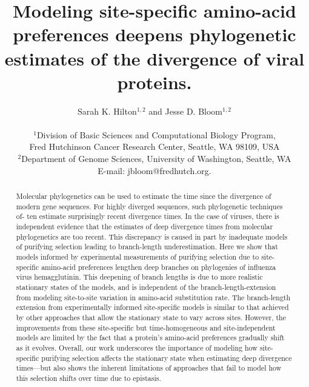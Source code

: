 \documentclass[11pt]{article}
\title{Modeling site-specific amino-acid preferences deepens phylogenetic estimates of the divergence of viral proteins.}
\author
{Sarah K. Hilton$^{1,2}$  and Jesse D. Bloom$^{1,2}$\\
\\
\normalsize{$^1$Division of Basic Sciences and Computational Biology Program,}\\
\normalsize{Fred Hutchinson Cancer Research Center, Seattle, WA 98109, USA}\\
\normalsize{$^2$Department of Genome Sciences, University of Washington, Seattle, WA}\\
\normalsize{E-mail:  jbloom@fredhutch.org.}\\
}
\date{}
\begin{document}
 


\maketitle 


\begin{abstract}
\noindent  
Molecular phylogenetics can be used to estimate the time since the divergence of modern gene sequences.
For highly diverged sequences, such phylogenetic techniques of- ten estimate surprisingly recent divergence times. 
In the case of viruses, there is independent evidence that the estimates of deep divergence times from molecular phylogenetics are too recent.
This discrepancy is caused in part by inadequate models of purifying selection leading to branch-length underestimation.
Here we show that models informed by experimental measurements of purifying selection due to site-specific amino-acid preferences lengthen deep branches on phylogenies of influenza virus hemagglutinin.
This deepening of branch lengths is due to more realistic stationary states of the models, and is independent of the branch-length-extension from modeling site-to-site variation in amino-acid substitution rate.
The branch-length extension from experimentally informed site-specific models is similar to that achieved by other approaches that allow the stationary state to vary across sites.
However, the improvements from these site-specific but time-homogeneous and site-independent models are limited by the fact that a protein's amino-acid preferences gradually shift as it evolves.
Overall, our work underscores the importance of modeling how site-specific purifying selection affects the stationary state when estimating deep divergence times---but also shows the inherent limitations of approaches that fail to model how this selection shifts over time due to epistasis. 
\end{abstract}

\clearpage
\end{document}
